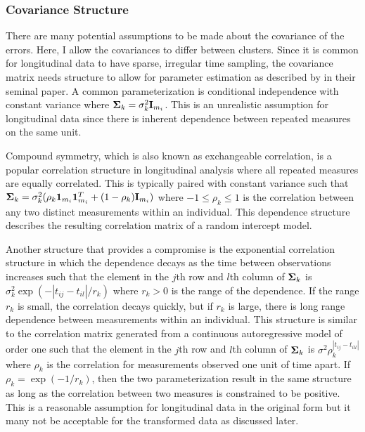 \subsubsection{Covariance Structure}
There are many potential assumptions to be made about the covariance of the errors. Here, I allow the covariances to differ between clusters. Since it is common for longitudinal data to have sparse, irregular time sampling, the covariance matrix needs structure to allow for parameter estimation as described by \textcite{jennrich1986} in their seminal paper. A common parameterization is conditional independence with constant variance where $\mathbf \Sigma_{k}= \sigma_{k}^{2}\mathbf I_{m_{i}}$. This is an unrealistic assumption for longitudinal data since there is inherent dependence between repeated measures on the same unit. 

Compound symmetry, which is also known as exchangeable correlation, is a popular correlation structure in longitudinal analysis where all repeated measures are equally correlated. This is typically paired with constant variance such that $\mathbf \Sigma_{k} = \sigma_{k}^{2}(\rho_{k}\mathbf1_{m_{i}}\mathbf1_{m_{i}}^{T}+(1-\rho_{k})\mathbf I_{m_{i}})$ where $-1\leq\rho_{k}\leq 1$ is the correlation between any two distinct measurements within an individual. This dependence structure describes the resulting correlation matrix of a random intercept model.

Another structure that provides a compromise is the exponential correlation structure in which the dependence decays as the time between observations increases such that the element in the $j$th row and $l$th column of $\boldsymbol\Sigma_{k}$ is $\sigma_{k}^{2}\exp(-| t_{ij}-t_{il}| / r_{k})$ where $r_{k}> 0$ is the range of the dependence. If the range $r_{k}$ is small, the correlation decays quickly, but if $r_{k}$ is large, there is long range dependence between measurements within an individual. This structure is similar to the correlation matrix generated from a continuous autoregressive model of order one such that the element in the $j$th row and $l$th column of $\boldsymbol\Sigma_{k}$ is $\sigma^{2}\rho_{k}^{|t_{ij}-t_{ill}|}$ where $\rho_{k}$ is the correlation for measurements observed one unit of time apart. If $\rho_{k} = \exp(-1/r_{k})$, then the two parameterization result in the same structure as long as the correlation between two measures is constrained to be positive. This is a reasonable assumption for longitudinal data in the original form but it many not be acceptable for the transformed data as discussed later.

